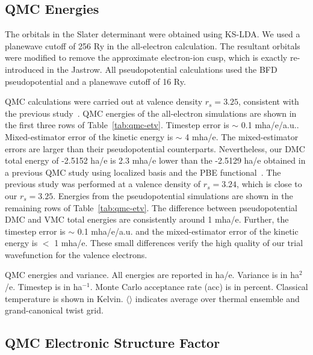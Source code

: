 \documentclass[aps,prl,superscriptaddress]{revtex4-1}
\begin{document}
\subsection{QMC Energies}

The orbitals in the Slater determinant were obtained using KS-LDA. We used a planewave cutoff of 256 Ry in the all-electron calculation. The resultant orbitals were modified to remove the approximate electron-ion cusp, which is exactly re-introduced in the Jastrow. All pseudopotential calculations used the BFD pseudopotential and a planewave cutoff of 16 Ry.

QMC calculations were carried out at valence density $r_s=3.25$, consistent with the previous study~\cite{Filippi1999}. 
QMC energies of the all-electron simulations are shown in the first three rows of Table~\ref{tab:qmc-etv}. Timestep error is $\sim$ 0.1 mha/e/a.u.. Mixed-estimator error of the kinetic energy is $\sim$ 4 mha/e. The mixed-estimator errors are larger than their pseudopotential counterparts. Nevertheless, our DMC total energy of -2.5152 ha/e is 2.3 mha/e lower than the -2.5129 ha/e obtained in a previous QMC study using localized basis and the PBE functional~\cite{Rasch2015}. The previous study was performed at a valence density of $r_s=3.24$, which is close to our $r_s=3.25$.
Energies from the pseudopotential simulations are shown in the remaining rows of Table~\ref{tab:qmc-etv}. The difference between pseudopotential DMC and VMC total energies are consistently around 1 mha/e. Further, the timestep error is $\sim$ 0.1 mha/e/a.u. and the mixed-estimator error of the kinetic energy is $<$ 1 mha/e. These small differences verify the high quality of our trial wavefunction for the valence electrons.

\begin{table}[h]
\caption{QMC energies and variance. All energies are reported in ha/e. Variance is in ha$^2$/e. Timestep is in ha$^{-1}$. Monte Carlo acceptance rate (acc) is in percent. Classical temperature is shown in Kelvin. $\langle\rangle$ indicates average over thermal ensemble and grand-canonical twist grid.}

\label{tab:qmc-etv}
\end{table}

\subsection{QMC Electronic Structure Factor}
\end{document}
